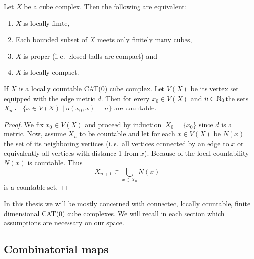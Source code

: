 \begin{prop}
  Let \(X\) be a cube complex. Then the following are equivalent:
  \begin{enumerate}
  \item \(X\) is locally finite,
  \item Each bounded subset of \(X\) meets only finitely many cubes,
  \item \(X\) is proper (i.\,e.\ closed balls are compact) and
  \item \(X\) is locally compact.
  \end{enumerate}
\end{prop}

\begin{lemma}
  \label{lem:lf-countable}
  If \(X\) is a locally countable CAT(0) cube complex. Let \(V(X)\) be its vertex set equipped with the edge metric \(d\). Then for every \(x_0 \in V(X)\) and \(n \in \mathbb{N}_0\)the sets \(X_n \coloneqq \{x \in V(X) \mid d(x_0, x) = n\}\) are countable.
\end{lemma}

\begin{proof}
  We fix \(x_0 \in V(X)\) and proceed by induction. \(X_0 = \{x_0\}\) since \(d\) is a metric. Now, assume \(X_n\) to be countable and let for each \(x \in V(X)\) be \(N(x)\) the set of its neighboring vertices (i.\,e.\ all vertices connected by an edge to \(x\) or equivalently all vertices with distance 1 from \(x\)). Because of the local countability \(N(x)\) is countable. Thus
  \[
    X_{n+1} \subset \bigcup_{x \in X_n} N(x)
  \]
  is a countable set.
\end{proof}

\begin{rem}
  In this thesis we will be mostly concerned with connectec, locally countable, finite dimensional CAT(0) cube complexes. We will recall in each section which assumptions are necessary on our space.
\end{rem}

\subsection{Combinatorial maps}
\label{sec:comb-map}

